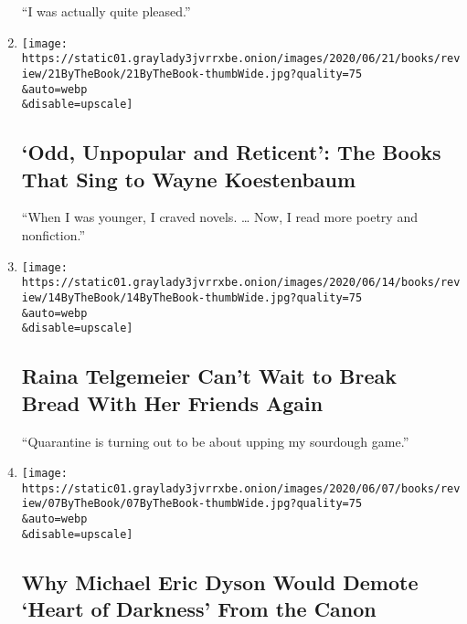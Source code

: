 \begin{enumerate}
  ``I was actually quite pleased.''
\item
  \href{/2020/06/18/books/review/wayne-koestenbaum-by-the-book-interview.html}{}

  \texttt{[image: https://static01.graylady3jvrrxbe.onion/images/2020/06/21/books/review/21ByTheBook/21ByTheBook-thumbWide.jpg?quality=75\\\&auto=webp\\\&disable=upscale]}

  \hypertarget{odd-unpopular-and-reticent-the-books-that-sing-to-wayne-koestenbaum}{%
  \subsection{`Odd, Unpopular and Reticent': The Books That Sing to
  Wayne
  Koestenbaum}\label{odd-unpopular-and-reticent-the-books-that-sing-to-wayne-koestenbaum}}

  ``When I was younger, I craved novels. \ldots{} Now, I read more
  poetry and nonfiction.''
\item
  \href{/2020/06/11/books/review/raina-telgemeier-by-the-book-interview.html}{}

  \texttt{[image: https://static01.graylady3jvrrxbe.onion/images/2020/06/14/books/review/14ByTheBook/14ByTheBook-thumbWide.jpg?quality=75\\\&auto=webp\\\&disable=upscale]}

  \hypertarget{raina-telgemeier-cant-wait-to-break-bread-with-her-friends-again}{%
  \subsection{Raina Telgemeier Can't Wait to Break Bread With Her
  Friends
  Again}\label{raina-telgemeier-cant-wait-to-break-bread-with-her-friends-again}}

  ``Quarantine is turning out to be about upping my sourdough game.''
\item
  \href{/2020/06/04/books/review/michael-eric-dyson-by-the-book-interview.html}{}

  \texttt{[image: https://static01.graylady3jvrrxbe.onion/images/2020/06/07/books/review/07ByTheBook/07ByTheBook-thumbWide.jpg?quality=75\\\&auto=webp\\\&disable=upscale]}

  \hypertarget{why-michael-eric-dyson-would-demote-heart-of-darkness-from-the-canon}{%
  \subsection{Why Michael Eric Dyson Would Demote `Heart of Darkness'
  From the
  Canon}\label{why-michael-eric-dyson-would-demote-heart-of-darkness-from-the-canon}}


\end{enumerate}
